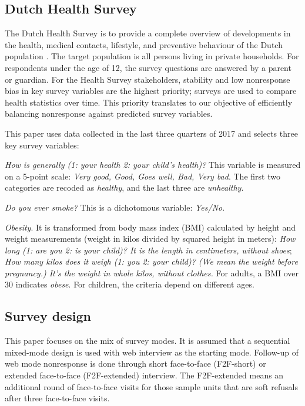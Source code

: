 \documentclass[11pt]{article}
\begin{document}
\subsection{Dutch Health Survey}
\label{sec:dhs}

The Dutch Health Survey is to provide a complete overview of developments in the health, medical contacts, lifestyle, and preventive behaviour of the Dutch population \cite{GEZO:2021}. The target population is all persons living in private households. For respondents under the age of 12, the survey questions are answered by a parent or guardian. For the Health Survey stakeholders, stability and low nonresponse bias in key survey variables are the highest priority; surveys are used to compare health statistics over time. This priority translates to our objective of efficiently balancing nonresponse against predicted survey variables.

This paper uses data collected in the last three quarters of 2017 and selects three key survey variables:

{\em How is generally (1: your health 2: your child's health)?} This variable is measured on a 5-point scale: {\em Very good, Good, Goes well, Bad, Very bad}. The first two categories are recoded as {\em healthy}, and the last three are {\em unhealthy}.

{\em Do you ever smoke?} This is a dichotomous variable: {\em Yes/No}.

{\em Obesity}. It is transformed from body mass index (BMI) calculated by height and weight measurements (weight in kilos divided by squared height in meters):
{\em How long (1: are you 2: is your child)? It is the length in centimeters, without shoes};
{\em How many kilos does it weigh (1: you 2: your child)? (We mean the weight before pregnancy.) It's the weight in whole kilos, without clothes.} For adults, a BMI over 30 indicates {\em obese}. For children, the criteria depend on different ages.

\subsection{Survey design}
\label{sec:design}

This paper focuses on the mix of survey modes. It is assumed that a sequential mixed-mode design is used with web interview as the starting mode. Follow-up of web mode nonresponse is done through short face-to-face (F2F-short) or extended face-to-face (F2F-extended) interview. The F2F-extended means an additional round of face-to-face visits for those sample units that are soft refusals after three face-to-face visits.
\end{document}
